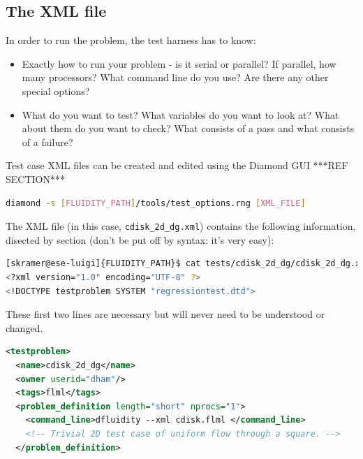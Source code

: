 \subsection{The XML file}

In order to run the problem, the test harness has to know:
\begin{itemize}
\item Exactly how to run your problem - is it serial or parallel? If parallel, how many processors? What command line do you use? Are there any other special options? 
\item What do you want to test? What variables do you want to look at? What about them do you want to check? What consists of a pass and what consists of a failure? 
\end{itemize}

Test case XML files can be created and edited using the Diamond GUI ***REF SECTION*** 

\begin{example}
\begin{lstlisting}[language=bash]
diamond -s [FLUIDITY_PATH]/tools/test_options.rng [XML_FILE]
\end{lstlisting}
\end{example}

The XML file (in this case, \lstinline[language=bash]+cdisk_2d_dg.xml+) contains the following information, disected by section (don't be put off by syntax: it's very easy):
\begin{example}
\begin{lstlisting}[language=bash]
[skramer@ese-luigi]{FLUIDITY_PATH}$ cat tests/cdisk_2d_dg/cdisk_2d_dg.xml
<?xml version="1.0" encoding="UTF-8" ?> 
<!DOCTYPE testproblem SYSTEM "regressiontest.dtd"> 
\end{lstlisting}
\end{example}

These first two lines are necessary but will never need to be understood or changed.
\begin{example}
\begin{lstlisting}[language=xml]
<testproblem> 
  <name>cdisk_2d_dg</name>
  <owner userid="dham"/>
  <tags>flml</tags>
  <problem_definition length="short" nprocs="1">
    <command_line>dfluidity --xml cdisk.flml </command_line>
    <!-- Trivial 2D test case of uniform flow through a square. -->
  </problem_definition>
\end{lstlisting} 
\end{example}


